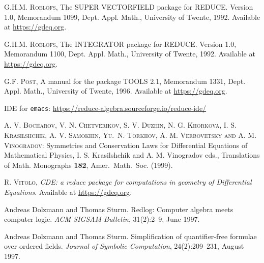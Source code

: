 \begin{thebibliography}{999}
 \textsc{G.H.M. Roelofs}, The SUPER VECTORFIELD package for
    REDUCE. Version 1.0, Memorandum 1099, Dept. Appl. Math., University of
    Twente, 1992. Available at \url{https://gdeq.org}.

 \textsc{G.H.M. Roelofs}, The INTEGRATOR package for
    REDUCE. Version 1.0, Memorandum 1100, Dept. Appl. Math., University of
    Twente, 1992. Available at \url{https://gdeq.org}.

 \textsc{G.F. Post}, A manual for the package TOOLS 2.1,
    Memorandum 1331, Dept. Appl. Math., University of Twente, 1996. Available
    at \url{https://gdeq.org}.

 \REDUCE IDE for \texttt{emacs}:
    \url{https://reduce-algebra.sourceforge.io/reduce-ide/}

 \textsc{A. V. Bocharov, V. N. Chetverikov, S. V.  Duzhin, N.
      G.  Khor{\cprime}kova, I. S.  Krasil{\cprime}shchik, A.  V.  Samokhin,
      Yu.\ N.  Torkhov, A. M. Verbovetsky and A. M.  Vinogradov}: Symmetries
    and Conservation Laws for Differential Equations of Mathematical Physics,
    I.  S.  Krasil{\cprime}shchik and A. M.  Vinogradov eds., Translations of
    Math.  Monographs \textbf{182}, Amer.\ Math.\ Soc. (1999).



 \textsc{R. Vitolo}, \emph{CDE: a reduce package for computations
  in geometry of Differential Equations}. Available at \url{https://gdeq.org}.



Andreas Dolzmann and Thomas Sturm.
\newblock Redlog: Computer algebra meets computer logic.
\newblock \emph{ACM SIGSAM Bulletin}, 31(2):2--9, June 1997.

Andreas Dolzmann and Thomas Sturm.
\newblock Simplification of quantifier-free formulae over ordered fields.
\newblock \emph{Journal of Symbolic Computation}, 24(2):209--231, August 1997.


\end{thebibliography}
